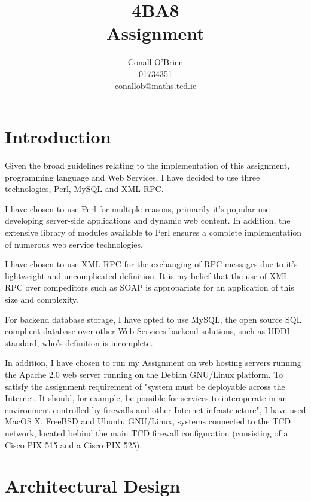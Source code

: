 \documentclass[a4paper,12pt]{article}
\begin{document}
\title{4BA8 \\ Assignment}

\author{Conall O'Brien \\ 01734351 \\ conallob@maths.tcd.ie}

\maketitle

\section{Introduction}

Given the broad guidelines relating to the implementation of this 
assignment,  programming language and Web Services, I have decided to 
use three technologies, Perl, MySQL and XML-RPC.


I have chosen to use Perl for multiple reasons, primarily it's
popular use developing server-side applications and dynamic web content.
In addition, the extensive library of modules available to Perl ensures
a complete implementation of numerous web service technologies.


I have chosen to use XML-RPC for the exchanging of RPC messages due to
it's lightweight and uncomplicated definition. It is my belief that the 
use of XML-RPC over compeditors such as SOAP is appropariate for an
application of this size and complexity.


For backend database storage, I have opted to use MySQL, the open source
SQL complient database over other Web Services backend solutions, such 
as UDDI standard, who's definition is incomplete.


In addition, I have chosen to run my Assignment on web hosting servers
running the Apache 2.0 web server running on the Debian GNU/Linux
platform. To satisfy the assignment requirement of "system must be 
deployable across the Internet. It should, for example, be possible for 
services to interoperate in an environment controlled by firewalls and 
other Internet infrastructure", I have used MacOS X, FreeBSD and Ubuntu 
GNU/Linux, systems connected to the TCD network, located behind the
main TCD firewall configuration (consisting of a Cisco PIX 515 and a 
Cisco PIX 525).

\section{Architectural Design}
\end{document}
